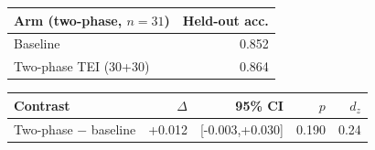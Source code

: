 \begin{tabular}{lr}
\toprule
Arm (two-phase, $n=31$) & Held-out acc. \\
\midrule
Baseline & 0.852 \\
Two-phase TEI (30+30) & 0.864 \\
\bottomrule
\end{tabular}

\vspace{4pt}

\begin{tabular}{lrrrr}
\toprule
Contrast & $\Delta$ & 95\% CI & $p$ & $d_z$ \\
\midrule
Two-phase $-$ baseline & +0.012 & [-0.003,+0.030] & 0.190 & 0.24 \\
\bottomrule
\end{tabular}